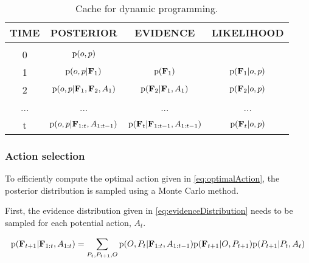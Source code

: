             \setlength{\tabcolsep}{.25em}
            \begin{table}[h]
                \caption{Cache for dynamic programming.}
                \label{tab:dynamicProgramming}
                \begin{center}
                \begin{tabular}{cccc} %
                    {\bf TIME} & {\bf POSTERIOR} & {\bf EVIDENCE} & {\bf LIKELIHOOD}
                    \\ \hline \\
                    0 & $\text{p}(o,p)$ & & \\[0.5em]
                    1 & $\text{p}(o,p|\mathbf{F}_1)$ & $\text{p}(\mathbf{F}_1)$ & $\text{p}(\mathbf{F}_1|o,p)$ \\[0.5em]
                    2 & $\text{p}(o,p|\mathbf{F}_1,\mathbf{F}_2,A_1)$ & $\text{p}(\mathbf{F}_2|\mathbf{F}_1,A_1)$ & $\text{p}(\mathbf{F}_2|o,p)$ \\[0.5em]
                    ...&...&...&...\\[0.5em]
                    t & $\text{p}(o,p|\mathbf{F}_{1:t},A_{1:t-1})$ & $\text{p}(\mathbf{F}_t|\mathbf{F}_{1:t-1},A_{1:t-1})$ & $\text{p}(\mathbf{F}_t|o,p)$ \\
                \end{tabular}
                \end{center}
            \end{table}

            \subsubsection{Action selection}

                To efficiently compute the optimal action given in \eqref{eq:optimalAction}, the posterior distribution is sampled using a Monte Carlo method. 

                First, the evidence distribution given in \eqref{eq:evidenceDistribution} needs to be sampled for each potential action, $A_{t}$.

                \begin{equation}
                    \label{eq:evidenceDistribution}
                    \text{p}(\mathbf{F}_{t+1}|\mathbf{F}_{1:t}, A_{1:t}) = \sum_{P_t,P_{t+1},O} \text{p}(O,P_t|\mathbf{F}_{1:t},A_{1:t-1}) \text{p}(\mathbf{F}_{t+1}|O,P_{t+1}) \text{p}(P_{t+1}|P_t,A_t)
                \end{equation}


